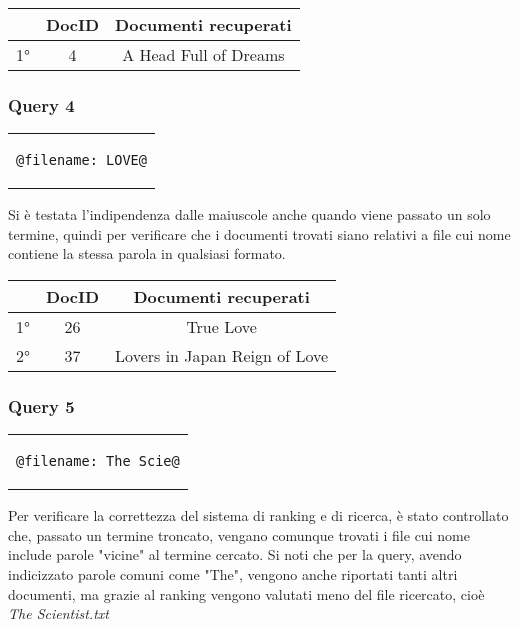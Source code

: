 \documentclass{article}
\begin{document}
\begin{table}[h!]
\centering
    \begin{tabular}{|c|c|c|}
    \hline
    & DocID & Documenti recuperati\\
    \hline
    1° & 4 & A Head Full of Dreams\\
    \hline
\end{tabular}
\end{table}

\subsubsection{Query 4}
\begin{center}
\begin{tabular}{c}
\begin{lstlisting}[style=prompt]
    @filename: LOVE@
\end{lstlisting}
\end{tabular}    
\end{center}
Si è testata l'indipendenza dalle maiuscole anche quando viene passato un solo termine, quindi per verificare che i documenti trovati siano relativi a file cui nome contiene la stessa parola in qualsiasi formato.

\begin{table}[h!]
\centering
    \begin{tabular}{|c|c|c|}
    \hline
    & DocID & Documenti recuperati\\
    \hline
    1° & 26 & True Love\\
    \hline
    2° & 37 & Lovers in Japan Reign of Love\\
    \hline
\end{tabular}
\end{table}

\subsubsection{Query 5}
\begin{center}
\begin{tabular}{c}
\begin{lstlisting}[style=prompt]
    @filename: The Scie@
\end{lstlisting}
\end{tabular}    
\end{center}
Per verificare la correttezza del sistema di ranking e di ricerca, è stato controllato che, passato un termine troncato, vengano comunque trovati i file cui nome include parole "vicine" al termine cercato. Si noti che per la query, avendo indicizzato parole comuni come "The", vengono anche riportati tanti altri documenti, ma grazie al ranking vengono valutati meno del file ricercato, cioè \textit{The Scientist.txt}
\end{document}
